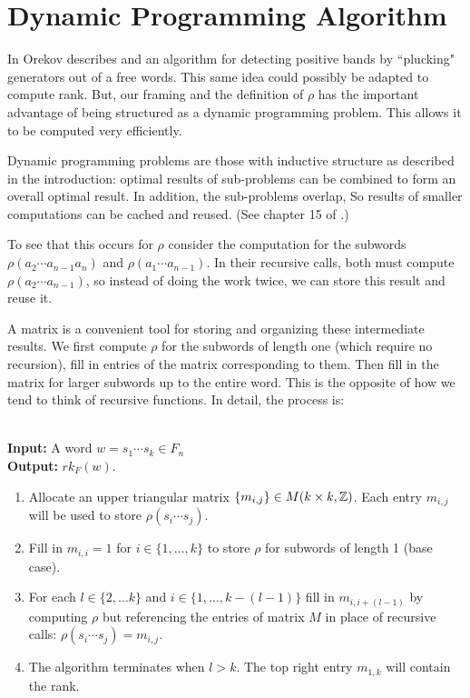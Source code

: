 \documentclass[12pt]{thesis}
\begin{document}
\section{Dynamic Programming Algorithm}

In \cite{quasipositive-3-braids} Orekov describes and an algorithm
for detecting positive bands by ``plucking" generators out of a free words.
This same idea could possibly be adapted to compute rank.
But, our framing and the definition of $\rho$ has the important advantage of being structured as a dynamic programming problem.
This allows it to be computed very efficiently.

Dynamic programming problems are those with inductive structure
as described in the introduction:
optimal results of sub-problems can be combined to form
an overall optimal result. In addition, the sub-problems overlap,
So results of smaller computations can be cached and reused.
(See chapter 15 of \cite{clrs}.)

To see that this occurs for $\rho$
consider the computation for the subwords $\rho( a_{2} \cdots a_{n - 1} a_{n} )$ and $\rho(  a_{1} \cdots a_{n - 1} )$.
In their recursive calls, both must compute $\rho( a_{2} \cdots a_{n - 1})$, so instead of doing
the work twice, we can store this result and reuse it. 

A matrix is a convenient tool for storing and organizing these intermediate results.
We first compute $\rho$ for the subwords
of length one (which require no recursion), fill in entries of the matrix corresponding to them.
Then fill in the matrix for larger subwords up to the entire word.
This is the opposite of how we tend to think of recursive functions.
In detail, the process is: 

\begin{algorithm}
    ~ \\
    \textbf{Input:} A word $w = s_{1} \cdots s_{k} \in F_{n}$
    ~\\
    \textbf{Output:} $rk_{F}(w)$. 

\begin{enumerate}
    \item Allocate an upper triangular matrix $\{ m_{i, j} \} \in M(k \times k, \mathbb{Z})$. 
          Each entry $m_{i, j}$ will be used to store $\rho(s_{i} \cdots s_{j})$.

    \item Fill in $m_{i, i} = 1$ for $i \in \{ 1, \ldots, k \}$
           to store $\rho$ for subwords of length 1 (base case).

      \item For each $l \in \{ 2, \ldots k \}$ and $i \in \{ 1, \ldots, k - (l - 1) \}$
           fill in $m_{i, i + (l - 1)}$ by computing $\rho$ but referencing
           the entries of matrix $M$ in place of recursive calls: $\rho(s_{i} \cdots s_{j}) = m_{i, j}$.
     
    \item The algorithm terminates when $l > k$.
          The top right entry $m_{1, k}$ will contain the rank.
\end{enumerate}

\end{algorithm}
\end{document}
